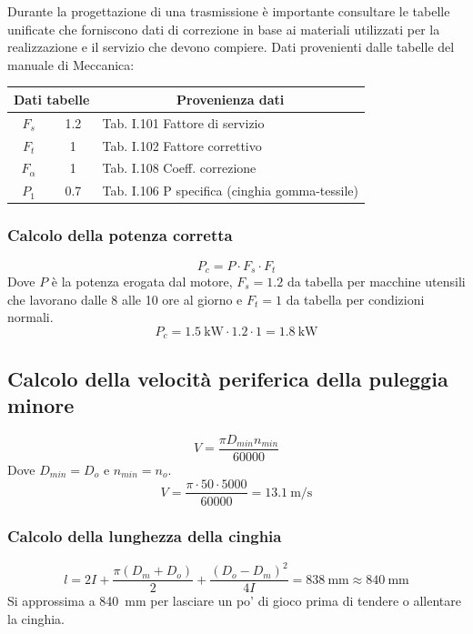 \documentclass{report}
\begin{document}
Durante la progettazione di una trasmissione è importante consultare le tabelle unificate che forniscono dati di correzione in base ai materiali utilizzati per la realizzazione e il servizio che devono compiere.
Dati provenienti dalle tabelle del manuale di Meccanica:
\begin{table}[H]
\centering
\begin{tabular}{|c|c|l|}
\hline
\multicolumn{2}{|c|}{\textbf{Dati tabelle}} & \multicolumn{1}{c|}{\textbf{Provenienza dati}} \\ \hline
$F_s$ & \num{1,2} & Tab. I.101 Fattore di servizio \\ \hline
$F_t$ & \num{1} & Tab. I.102 Fattore correttivo \\ \hline
$F_\alpha$ & \num{1} & Tab. I.108 Coeff. correzione \\ \hline
$P_1$ & \num{0,7} & Tab. I.106 P specifica (cinghia gomma-tessile) \\ \hline
\end{tabular}
\end{table}

\subsubsection{Calcolo della potenza corretta}
\begin{equation}
P_c=P\cdot F_s\cdot F_t
\end{equation}
Dove $P$ è la potenza erogata dal motore, $F_s=\num{1,2}$ da tabella per macchine utensili che lavorano dalle 8 alle 10 ore al giorno e $F_t=1$ da tabella per condizioni normali.
\begin{equation}
P_c = \SI{1,5}{\kW}\cdot \num{1,2}\cdot 1 = \SI{1,8}{\kW}
\end{equation}
\subsection{Calcolo della velocità periferica della puleggia minore}
\begin{equation}
  V = \frac{\pi D_{min}n_{min}}{\num{60000}}
\end{equation}
Dove $D_{min}=D_o$ e $n_{min}=n_o$.
\begin{equation}
V=\frac{\pi\cdot 50\cdot 5000}{\num{60000}} = \SI{13,1}{\m\per\s}
\end{equation}

\subsubsection{Calcolo della lunghezza della cinghia}
\begin{equation}
  l=2I+\frac{\pi (D_m+D_o)}{2}+\frac{(D_o-D_m)^2}{4I}=\SI{838}{\mm}\approx\SI{840}{\mm}
\end{equation}
Si approssima a \SI{840}{\mm} per lasciare un po' di gioco prima di tendere o allentare la cinghia.
\end{document}
